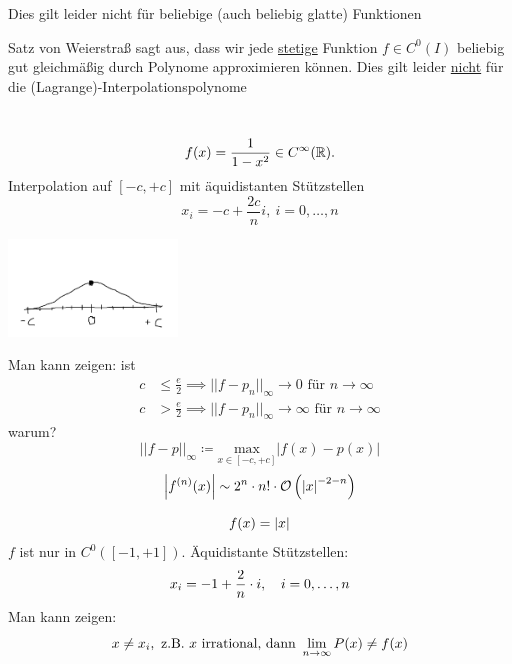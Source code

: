 \begin{remark}
    Dies gilt leider nicht für beliebige (auch beliebig glatte) Funktionen
\end{remark}

\begin{remark}
    Satz von Weierstraß sagt aus, dass wir jede \underline{stetige} Funktion $f\in C^0(I)$ beliebig gut gleichmäßig durch 
    Polynome approximieren können. Dies gilt leider \underline{nicht} für die (Lagrange)-Interpolationspolynome
\end{remark}
\begin{example}\hfill\\
\[f(x)=\frac{1}{1-x^2}\in C^\infty (\mathbb{R}).
\]
Interpolation auf $[-c,+c]$ mit äquidistanten Stützstellen
\[x_i=-c+\frac{2c}{n}i,\ i=0,\dots,n\] 
\begin{center}
    \includegraphics[width=45mm]{../Bilder/x_2.png}\\
\end{center}
Man kann zeigen: ist
\begin{align*}
    c&\leq \frac{e}{2}\implies ||f-p_n||_\infty \to 0 \text{ 
 für } n\to \infty\\
 c&> \frac{e}{2}\implies ||f-p_n||_\infty \to \infty \text{ 
 für } n\to \infty
\end{align*}
warum?\\
\[||f-p||_\infty\coloneqq\underset{x\in [-c,+c]}{\text{max}}|f(x)-p(x)|\] %
\[\abs{f^{(n)}(x)} \sim 2^n\cdot n! \cdot \calO{ \abs{x}^{-2-n}}\]

\end{example}
\begin{example}
    \[
        f(x) = \left\vert x \right\vert
    \]
    $f$ ist nur in $C^0([-1,+1])$. Äquidistante Stützstellen:\[
    x_i = -1+\frac{2}{n}\cdot i, \hspace{1em} i=0,\dots,n
    \]
    Man kann zeigen:\[
    x\neq x_i, \ \text{z.B. } x \text{ irrational, dann }\lim_{n\to\infty} P(x) \neq f(x)
    \]
\end{example}
